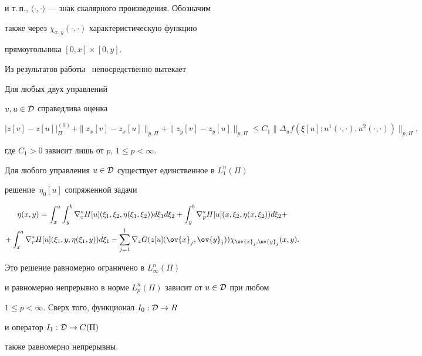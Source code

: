 и т.\,п., $\langle\cdot,\cdot\rangle$ --- знак скалярного произведения. Обозначим


также через $\chi_{x, y}(\cdot,\cdot)$ характеристическую функцию


прямоугольника $[0, x]\times[0, y]$. 


Из результатов работы~\cite{plotsumv72} непосредственно вытекает








\begin{lems}\label{ev1}


Для любых двух управлений


$v,  u\in {\cal D}$ справедлива оценка


\begin{equation*} %


|z[v]-z[u]|^{(0)}_\Pi+\|z_x[v]-z_x[u]\|_{p, \Pi}+\|z_y[v]-z_y[u]\|_{p, \Pi}\leq


C_1\|\Delta_uf(\xi[u]; u^1(\cdot,\cdot), u^2(\cdot,\cdot))\|_{p, \Pi},


\end{equation*}


где $C_1>0$ зависит лишь от $p$, $1\leq p<\infty$.





Для любого управления $u\in {\cal D}$ существует единственное в $L^n_1(\Pi)$


решение~$\eta_0[u]$ сопряженной задачи


\begin{multline*} %


\eta(x,y)=\int_x^a\int_y^b\nabla_z^*H[u](\xi_1,\xi_2,\eta(\xi_1,\xi_2))


d\xi_1 d\xi_2+


\int_y^b\nabla_p^*H[u](x,\xi_2,\eta(x,\xi_2)) d\xi_2+ \\


%


+\int_x^a\nabla_r^*H[u](\xi_1,y,\eta(\xi_1,y)) d\xi_1-


\sum_{j=1}^l\nabla_zG(z[u](\ov{x}_j,\ov{y}_j))\chi_{\ov{x}_j,\ov{y}_j}(x,y).


\end{multline*}


Это решение равномерно ограничено в $L_\infty^n(\Pi)$


и равномерно непрерывно в норме $L_p^n(\Pi)$ зависит от $u\in{\cal D}$ при любом


$1\leq p<\infty$. Сверх того, функционал $I_0: {\cal D}\to R$


и оператор $I_1: {\cal D}\to C(\Pi)$


также равномерно непрерывны.


\end{lems}





